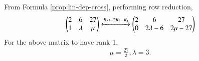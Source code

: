 From 
		 Formula \ref{prop:lin-dep-cross},
performing row reduction, 
\begin{align}
 \begin{pmatrix}2&6&27 \\ 1& \lambda & \mu\end{pmatrix}
	\xleftrightarrow{R_{2}\leftarrow 2R_{2}-R_{1}}  	
 \begin{pmatrix}2&6&27 \\ 0& 2\lambda -6 & 2\mu-27\end{pmatrix}
\end{align}
For the above matrix to have rank 1,
\begin{align}
	\mu=\frac{27}{2},
	\lambda=3.
\end{align}


